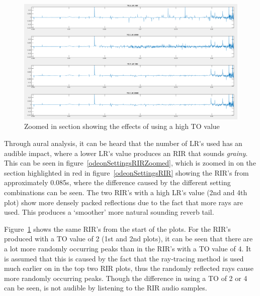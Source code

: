 \documentclass[../../main.tex]{subfiles}
\begin{document}
			\begin{figure}[h]
				\centerline{\includegraphics[scale = 0.35]{Sections/Implementation/Odeon/images/OdeonSettings/settingsFigure_TOZoom.png}}
				\caption{Zoomed in section showing the effects of using a high \ac{TO} value}
				\label{odeonSettings_TOZoomed}
			\end{figure}

				Through aural analysis, it can be heard that the number of \ac{LR's} used has an audible impact, where a lower \ac{LR's} value produces an \ac{RIR} that sounds \textit{grainy}. This can be seen in figure~\ref{odeonSettingsRIRZoomed}, which is zoomed in on the section highlighted in red in figure~\ref{odeonSettingsRIR} showing the \ac{RIR}'s from approximately 0.085s, where the difference caused by the different setting combinations can be seen. The two \ac{RIR}'s with a high \ac{LR's} value (2nd and 4th plot) show more densely packed reflections due to the fact that more rays are used. This produces a `smoother' more natural sounding reverb tail.


				Figure~\ref{odeonSettings_TOZoomed} shows the same \ac{RIR}'s from the start of the plots. For the \ac{RIR}'s produced with a \ac{TO} value of 2 (1st and 2nd plots), it can be seen that there are a lot more randomly occurring peaks than in the \ac{RIR}'s with a \ac{TO} value of 4. It is assumed that this is caused by the fact that the ray-tracing method is used much earlier on in the top two \ac{RIR} plots, thus the randomly reflected rays cause more randomly occurring peaks. Though the difference in using a \ac{TO} of 2 or 4 can be seen, is not audible by listening to the \ac{RIR} audio samples.
\end{document}
